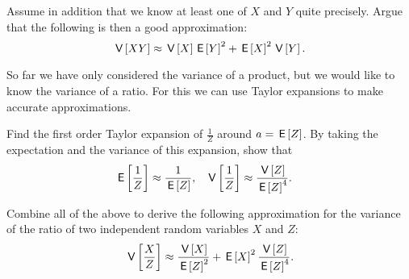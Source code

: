 \documentclass[assignments]{subfiles}
\begin{document}
\begin{exercise} \label{ex:beluga5}
Assume in addition that we know at least one of $X$ and $Y$ quite precisely. Argue that the following is then a good approximation:
\begin{equation*}
\,\mathsf{V}\left[X Y\right] \approx \,\mathsf{V}\left[X\right] \,\mathsf{E}\left[Y\right]^2 + \,\mathsf{E}\left[X\right]^2 \,\mathsf{V}\left[Y\right].
\end{equation*}
\end{exercise}


So far we have only considered the variance of a product, but we would like to know the variance of a ratio.
For this we can use Taylor expansions to  make accurate approximations.

\begin{exercise}  \label{ex:beluga6}
Find the first order Taylor expansion of $\frac{1}{Z}$ around $a=  \,\mathsf{E}\left[Z\right]$. By taking the expectation and the variance of this expansion, show that
\begin{align*}
\,\mathsf{E}\left[\frac{1}{Z}\right] &\approx \frac{1}{\,\mathsf{E}\left[Z\right]}, & \,\mathsf{V}\left[\frac{1}{Z}\right] &\approx \frac{\,\mathsf{V}\left[Z\right]}{\,\mathsf{E}\left[Z\right]^4}.
\end{align*}
\end{exercise}

\begin{exercise}
Combine all of the above to derive the following approximation for the variance of the ratio of two independent random variables $X$ and $Z$:
\begin{equation*}
\,\mathsf{V}\left[\frac{X}{Z}\right] \approx \frac{\,\mathsf{V}\left[X\right]}{\,\mathsf{E}\left[Z\right]^2} + \,\mathsf{E}\left[X\right]^2\frac{\,\mathsf{V}\left[Z\right]}{\,\mathsf{E}\left[Z\right]^4}.
\end{equation*}
\end{exercise}
\end{document}
